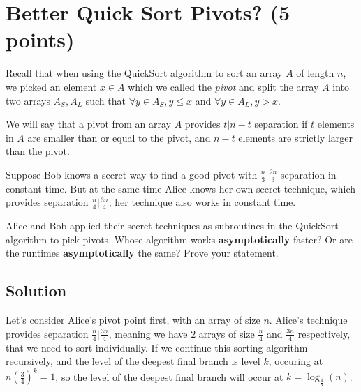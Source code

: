 \documentclass[letter,11pt]{article}
\begin{document}
\newpage

\section{Better Quick Sort Pivots? (5 points)}

Recall that when using the QuickSort algorithm to sort an array $A$ of length $n$, we picked an element $x \in A$ which we called the \emph{pivot} and split the array $A$ into two arrays $A_S, A_L$ such that $\forall y \in A_S, y \leq x$ and $\forall y \in A_L, y > x$. 

We will say that a pivot from an array $A$ provides $t|n-t$ separation if $t$ elements in $A$ are smaller than or equal to the pivot, and $n-t$ elements are strictly larger than the pivot.

Suppose Bob knows a secret way to find a good pivot with $\frac{n}{3} | \frac{2n}{3}$ separation in constant time. But at the same time Alice knows her own secret technique, which provides separation $\frac{n}{4} | \frac{3n}{4}$, her technique also works in constant time.

Alice and Bob applied their secret techniques as subroutines in the QuickSort algorithm to pick pivots. Whose algorithm works \textbf{asymptotically} faster? Or are the runtimes \textbf{asymptotically} the same? Prove your statement.

\subsection{Solution}

Let's consider Alice's pivot point first, with an array of size $n$. Alice's technique provides separation $\frac{n}{4} | \frac{3n}{4}$, meaning we have $2$ arrays of size $\frac{n}{4}$ and $\frac{3n}{4}$ respectively, that we need to sort individually. If we continue this sorting algorithm recursively, and the level of the deepest final branch is level $k$, occuring at $n(\frac{3}{4})^k = 1$, so the level of the deepest final branch will occur at $k = \log_{\frac{4}{3}}(n)$.
\end{document}
